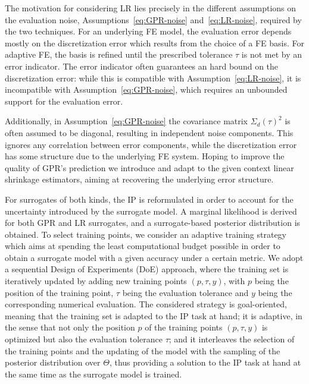 The motivation for considering LR lies precisely in the different assumptions on the evaluation noise, Assumptions~\ref{eq:GPR-noise} and~\ref{eq:LR-noise}, required by the two techniques.
For an underlying FE model, the evaluation error depends mostly on the discretization error which results from the choice of a FE basis.
For adaptive FE, the basis is refined until the prescribed tolerance $\tau$ is not met by an error indicator.
The error indicator often guarantees an hard bound on the discretization error: while this is compatible with Assumption~\ref{eq:LR-noise}, it is incompatible with Assumption~\ref{eq:GPR-noise}, which requires an unbounded support for the evaluation error. 

Additionally, in Assumption~\ref{eq:GPR-noise} the covariance matrix $\Sigma_d(\tau)^2$ is often assumed to be diagonal, resulting in independent noise components. 
This ignores any correlation between error components, while the discretization error has some structure due to the underlying FE system.
Hoping to improve the quality of GPR's prediction we introduce and adapt to the given context linear shrinkage estimators, aiming at recovering the underlying error structure. \medskip

For surrogates of both kinds, the IP is reformulated in order to account for the uncertainty introduced by the surrogate model.
A marginal likelihood is derived for both GPR and LR surrogates, and a surrogate-based posterior distribution is obtained.
To select training points, we consider an adaptive training strategy which aims at spending the least computational budget possible in order to obtain a surrogate model with a given accuracy under a certain metric.
We adopt a sequential Design of Experiments (DoE) approach, where the training set is iteratively updated by adding new training points $(p,\tau,y)$, with $p$ being the position of the training point, $\tau$ being the evaluation tolerance and $y$ being the corresponding numerical evaluation.
The considered strategy is goal-oriented, meaning that the training set is adapted to the IP task at hand; it is adaptive, in the sense that not only the position $p$ of the training points $(p,\tau,y)$ is optimized but also the evaluation tolerance $\tau$; and it interleaves the selection of the training points and the updating of the model with the sampling of the posterior distribution over $\Theta$, thus providing a solution to the IP task at hand at the same time as the surrogate model is trained. \medskip

